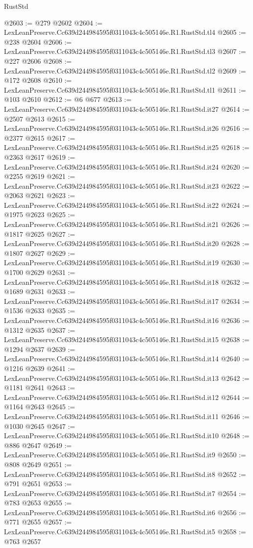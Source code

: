 \begin{lexlean}{RustStd}
\begin{coremodule}
@2603 := @279 @2602
@2604 := LexLeanPreserve.Cc639d244984595f0311043c4c505146e.R1.RustStd.tl4
@2605 := @238 @2604
@2606 := LexLeanPreserve.Cc639d244984595f0311043c4c505146e.R1.RustStd.tl3
@2607 := @227 @2606
@2608 := LexLeanPreserve.Cc639d244984595f0311043c4c505146e.R1.RustStd.tl2
@2609 := @172 @2608
@2610 := LexLeanPreserve.Cc639d244984595f0311043c4c505146e.R1.RustStd.tl1
@2611 := @103 @2610
@2612 := @6 @677
@2613 := LexLeanPreserve.Cc639d244984595f0311043c4c505146e.R1.RustStd.it27
@2614 := @2507 @2613
@2615 := LexLeanPreserve.Cc639d244984595f0311043c4c505146e.R1.RustStd.it26
@2616 := @2377 @2615
@2617 := LexLeanPreserve.Cc639d244984595f0311043c4c505146e.R1.RustStd.it25
@2618 := @2363 @2617
@2619 := LexLeanPreserve.Cc639d244984595f0311043c4c505146e.R1.RustStd.it24
@2620 := @2255 @2619
@2621 := LexLeanPreserve.Cc639d244984595f0311043c4c505146e.R1.RustStd.it23
@2622 := @2063 @2621
@2623 := LexLeanPreserve.Cc639d244984595f0311043c4c505146e.R1.RustStd.it22
@2624 := @1975 @2623
@2625 := LexLeanPreserve.Cc639d244984595f0311043c4c505146e.R1.RustStd.it21
@2626 := @1817 @2625
@2627 := LexLeanPreserve.Cc639d244984595f0311043c4c505146e.R1.RustStd.it20
@2628 := @1807 @2627
@2629 := LexLeanPreserve.Cc639d244984595f0311043c4c505146e.R1.RustStd.it19
@2630 := @1700 @2629
@2631 := LexLeanPreserve.Cc639d244984595f0311043c4c505146e.R1.RustStd.it18
@2632 := @1689 @2631
@2633 := LexLeanPreserve.Cc639d244984595f0311043c4c505146e.R1.RustStd.it17
@2634 := @1536 @2633
@2635 := LexLeanPreserve.Cc639d244984595f0311043c4c505146e.R1.RustStd.it16
@2636 := @1312 @2635
@2637 := LexLeanPreserve.Cc639d244984595f0311043c4c505146e.R1.RustStd.it15
@2638 := @1294 @2637
@2639 := LexLeanPreserve.Cc639d244984595f0311043c4c505146e.R1.RustStd.it14
@2640 := @1216 @2639
@2641 := LexLeanPreserve.Cc639d244984595f0311043c4c505146e.R1.RustStd.it13
@2642 := @1181 @2641
@2643 := LexLeanPreserve.Cc639d244984595f0311043c4c505146e.R1.RustStd.it12
@2644 := @1164 @2643
@2645 := LexLeanPreserve.Cc639d244984595f0311043c4c505146e.R1.RustStd.it11
@2646 := @1030 @2645
@2647 := LexLeanPreserve.Cc639d244984595f0311043c4c505146e.R1.RustStd.it10
@2648 := @886 @2647
@2649 := LexLeanPreserve.Cc639d244984595f0311043c4c505146e.R1.RustStd.it9
@2650 := @808 @2649
@2651 := LexLeanPreserve.Cc639d244984595f0311043c4c505146e.R1.RustStd.it8
@2652 := @791 @2651
@2653 := LexLeanPreserve.Cc639d244984595f0311043c4c505146e.R1.RustStd.it7
@2654 := @783 @2653
@2655 := LexLeanPreserve.Cc639d244984595f0311043c4c505146e.R1.RustStd.it6
@2656 := @771 @2655
@2657 := LexLeanPreserve.Cc639d244984595f0311043c4c505146e.R1.RustStd.it5
@2658 := @763 @2657

\end{coremodule}
\end{lexlean}
